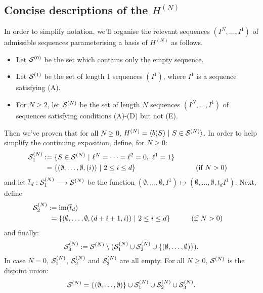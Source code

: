 \documentclass[10pt]{article}
\renewcommand{\Q}{Q}
\begin{document}
\begin{CalculatingRepeatedKoszul}
\subsection{Concise descriptions of the $H^{(N)}$}
In order to simplify notation, we'll organise the relevant sequences $(I^{N},\ldots,I^1)$ of admissible sequences parameterising a basis of $H^{{(N)}}$ as follows.
\begin{itemize}
\squishlist
\item Let $\mathcal{S}^{(0)}$ be the set which contains only the empty sequence.
\item Let $\mathcal{S}^{(1)}$ be the set of length 1 sequences $(I^1)$, where $I^1$ is a sequence satisfying \textup{(A)}.
\item For $N\geq2$, let $\mathcal{S}^{(N)}$ be the set of length $N$ sequences $(I^{N},\ldots,I^1)$ of sequences satisfying conditions \textup{(A)}-\textup{(D)} but not \textup{(E)}.
\end{itemize}
Then we've proven that for all $N\geq0$, $H^{(N)}=\langle b(S)\ |\ S\in\mathcal{S}^{(N)}\rangle$.
In order to help simplify the continuing exposition, define, for $N\geq0$:
\begin{alignat*}{2}
\calS^{(N)}_1
&:=
\{S\in \calS^{(N)}\ |\ \ell^{N}=\cdots =\ell^2=0,\ \ell^1=1\}%
\\
&\hphantom{:}=
\{(\emptyset,\ldots,\emptyset,(i))\ |\ 2\leq i\leq d\}&\qquad&\text{(if $N>0$)}
\end{alignat*}
and let $\overline{t}_d:\mathcal{S}_1^{(N)}\longrightarrow\mathcal{S}^{(N)}$ be the function $(\emptyset,\ldots,\emptyset,I^1)\mapsto (\emptyset,\ldots,\emptyset,t_dI^1)$. Next, define
\begin{alignat*}{2}
\calS^{(N)}_2
&:=
\im(\overline{t}_d)%
\\
&\hphantom{:}=
\{(\emptyset,\ldots,\emptyset,(d+i+1,i))\ |\ 2\leq i\leq d\}%
&\qquad&\text{(if $N>0$)}
\end{alignat*}
and finally:
\[\mathcal{S}^{(N)}_3:=\mathcal{S}^{(N)}\setminus(\mathcal{S}^{(N)}_1\cup \mathcal{S}^{(N)}_2\cup\{(\emptyset,\ldots,\emptyset)\}).\]
In case $N=0$, $\mathcal{S}^{(N)}_1$, $\mathcal{S}^{(N)}_2$ and $\mathcal{S}^{(N)}_3$ are all empty. For all $N\geq0$, $\mathcal{S}^{(N)}$ is the disjoint union:
\[\mathcal{S}^{(N)}=\{(\emptyset,\ldots,\emptyset)\}\cup\mathcal{S}^{(N)}_1\cup\mathcal{S}^{(N)}_2\cup\mathcal{S}^{(N)}_3.\]


\end{CalculatingRepeatedKoszul}
\end{document}
